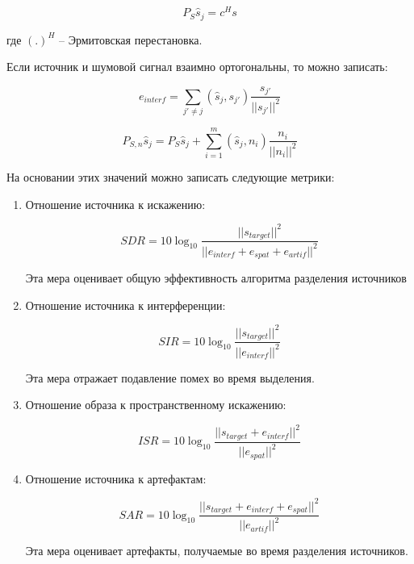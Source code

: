 \begin{equation}
P_S \hat{s}_j = c^H s
\end{equation}

где $(.)^H$ -- Эрмитовская перестановка. 

Если источник и шумовой сигнал взаимно ортогональны, то можно записать:

\begin{equation}
	e_{interf} = \sum_{j' \ne j} (\hat{s}_j, s_{j'}) \frac{s_{j'}}{|| s_{j'} ||^2}
\end{equation}

\begin{equation}
P_{S,n}\hat{s}_j = P_S \hat{s}_j + \sum_{i=1}^{m}(\hat{s}_j, n_i) \frac{n_i}{|| n_i ||^2}
\end{equation}

На основании этих значений можно записать следующие метрики:

\begin{enumerate}
	\item Отношение источника к искажению:
	
	\begin{equation}
		SDR = 10 \log_{10} \frac{|| s_{target} ||^2}{|| e_{interf} + e_{spat} + e_{artif} ||^2}
	\end{equation}
	
	Эта мера оценивает общую эффективность алгоритма разделения источников
	
	\item  Отношение источника к интерференции:
	
	\begin{equation}
		SIR = 10 \log_{10} \frac{|| s_{target} ||^2}{|| e_{interf} ||^2}
	\end{equation}
	
	Эта мера отражает подавление помех во время выделения.
	
	\item Отношение образа к пространственному искажению:
	
	\begin{equation}
	ISR = 10 \log_{10} \frac{|| s_{target} + e_{interf} ||^2}{|| e_{spat} ||^2}
	\end{equation}
	
	\item Отношение источника к артефактам:
	
	\begin{equation}
	SAR = 10 \log_{10} \frac{|| s_{target} + e_{interf} + e_{spat} ||^2}{|| e_{artif} ||^2}
	\end{equation}
	
	Эта мера оценивает артефакты, получаемые во время разделения источников.
\end{enumerate}

